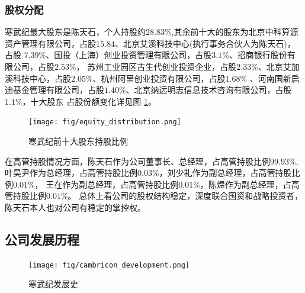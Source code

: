 \subsubsection{股权分配}
寒武纪最大股东是陈天石，个人持股约$28.83\%$,其余前十大的股东为北京中科算源资产管理有限公司，占股$15.84$、北京艾溪科技中心(执行事务合伙人为陈天石)，占股
$7.39\%$、国投（上海）创业投资管理有限公司，占股$3.1\%$、招商银行股份有限公司，占股$2.53\%$，
苏州工业园区古生代创业投资企业，占股$2.33\%$、北京艾加溪科技中心，占股$2.05\%$、杭州阿里创业投资有限公司，占股$1.68\%$
、河南国新启迪基金管理有限公司，占股$1.40\%$、北京纳远明志信息技术咨询有限公司，占股$1.1\%$，十大股东
占股份额变化详见图 \ref{equity_distribution}。
\begin{figure}[h]
    \centering
    \texttt{[image: fig/equity\_distribution.png]}
    \caption{寒武纪前十大股东持股比例}\label{equity_distribution}
\end{figure}

在高管持股情况方面，陈天石作为公司董事长、总经理，占高管持股比例$99.93\%$,
叶昊尹作为总经理，占高管持股比例$0.03\%$，刘少礼作为副总经理，占高管持股比例$0.01\%$，
王在作为副总经理，占高管持股比例$0.01\%$，陈煜作为副总经理，占高管持股比例$0.01\%$。
总体上看公司的股权结构稳定，深度联合国资和战略投资者，陈天石本人也对公司有稳定的掌控权。
\subsection{公司发展历程}
\begin{figure}[h]
    \centering
    \texttt{[image: fig/cambricon\_development.png]}
    \caption{寒武纪发展史}\label{cambricon_development}
\end{figure}
